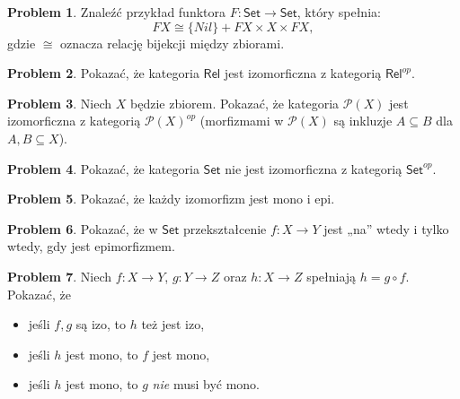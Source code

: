 \documentclass[10pt]{amsart}
\theoremstyle{plain}
\theoremstyle{definition}
\newtheorem{problem}{Problem}
\numberwithin{equation}{section}
\begin{document}
\begin{problem}
Znaleźć przykład funktora $F:\mathsf{Set}\to\mathsf{Set}$, który spełnia:
$$
FX \cong \{Nil\} + FX \times X \times FX, 
$$
gdzie $\cong$ oznacza relację bijekcji między zbiorami.
\end{problem}

\begin{problem}
Pokazać, że kategoria $\mathsf{Rel}$ jest izomorficzna z kategorią $\mathsf{Rel}^{op}$. 
\end{problem}

\begin{problem}
    Niech $X$ będzie zbiorem. Pokazać, że kategoria $\mathcal{P}(X)$ jest izomorficzna z kategorią $\mathcal{P}(X)^{op}$ (morfizmami w $\mathcal{P}(X)$ są inkluzje $A \subseteq B$ dla $A, B\subseteq X$).  
\end{problem}

\begin{problem}
Pokazać, że kategoria $\mathsf{Set}$ nie jest izomorficzna z kategorią $\mathsf{Set}^{op}$. 
\end{problem}


\begin{problem}
Pokazać, że każdy izomorfizm jest mono i epi.
\end{problem}

\begin{problem}
Pokazać, że w $\mathsf{Set}$ przekształcenie $f:X\to Y$ jest „na” wtedy i tylko wtedy, gdy jest epimorfizmem.
\end{problem}

\begin{problem}
Niech $f:X\to Y$, $g:Y\to Z$ oraz $h:X\to Z$ spełniają $h= g\circ f$. Pokazać, że 
\begin{itemize}
\item jeśli $f,g$ są izo, to $h$ też jest izo,
\item jeśli $h$ jest mono, to $f$ jest mono,
\item jeśli $h$ jest mono, to $g$ \emph{nie} musi być mono.
\end{itemize}
\end{problem}

\end{document}
